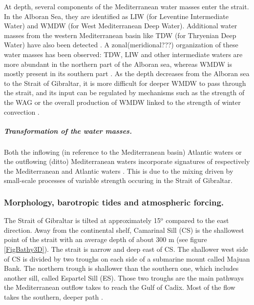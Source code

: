 At depth, several components of the Mediterranean water masses enter the strait. In the Alboran Sea, they are identified as LIW (for Leventine Intermediate Water) and WMDW (for West Mediterranean Deep Water).  Additional water masses from the western Mediterranean basin like TDW (for Thryenian Deep Water) have also been detected \citep{millot_2014}. A zonal(\color{blue}meridional???\color{black}) organization of these water masses has been observed: TDW, LIW and other intermediate waters are \color{black} more abundant in the northern part of the Alboran sea, whereas WMDW is mostly present in its southern part \citep{millot_2014}. As the depth decreases from the Alboran sea to the Strait of Gibraltar, it is more difficult for deeper WMDW to pass through the strait, and its input can be regulated by mechanisms such as the strength of the WAG or the overall production of WMDW linked to the strength of winter convection \citep{naranjo_2012}.

\subparagraph{Transformation of the water masses.}
Both the inflowing (in reference to the Mediterranean basin) Atlantic waters or the outflowing (ditto) Mediterranean waters incorporate signatures of respectively the Mediterranean \citep{macias_2006} and Atlantic waters \citep{millot_2007,garcia-lafuente_2011}. This is due to the mixing driven by small-scale processes of variable strength occuring in the Strait of Gibraltar.  


\subsubsection{Morphology, barotropic tides and atmospheric forcing.} 


The Strait of Gibraltar is tilted at approximately 15$^\text{o}$ compared to the east direction. Away from the continental shelf, Camarinal Sill (CS) is the shallowest point of the strait with an average depth of about 300 m (see figure \ref{FigBathy3D}). The strait is narrow and deep east of CS. The shallower west side of CS is divided by two troughs on each side of a submarine mount called Majuan Bank. The northern trough is shallower than the southern one, which includes another sill, called Espartel Sill (ES). Those two troughs are the main pathways the Mediterranean outflow takes to reach the Gulf of Cadix. Most of the flow takes the southern, deeper path \citep{soto-navarro_2015}.

